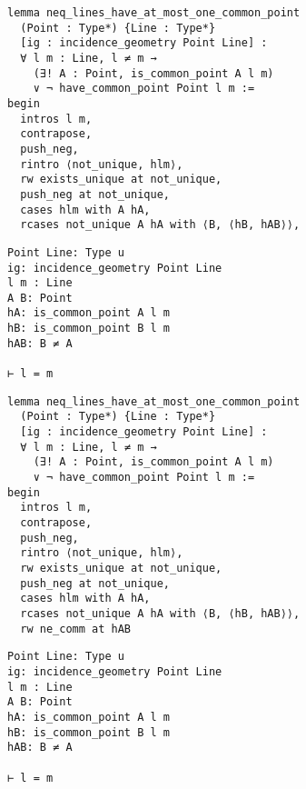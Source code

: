 \begin{frame}[fragile]
	\begin{multicols}{2}
		\begin{lstlisting}
lemma neq_lines_have_at_most_one_common_point 
  (Point : Type*) {Line : Type*} 
  [ig : incidence_geometry Point Line] :
  ∀ l m : Line, l ≠ m → 
    (∃! A : Point, is_common_point A l m) 
    ∨ ¬ have_common_point Point l m := 
begin
  intros l m,
  contrapose,
  push_neg,
  rintro ⟨not_unique, hlm⟩,
  rw exists_unique at not_unique,
  push_neg at not_unique,
  cases hlm with A hA,
  rcases not_unique A hA with ⟨B, ⟨hB, hAB⟩⟩,
\end{lstlisting}
		\columnbreak
		\begin{lstlisting}
Point Line: Type u
ig: incidence_geometry Point Line
l m : Line
A B: Point
hA: is_common_point A l m
hB: is_common_point B l m
hAB: B ≠ A

⊢ l = m
\end{lstlisting}
	\end{multicols}
\end{frame}










\begin{frame}[fragile]
	\begin{multicols}{2}
		\begin{lstlisting}
lemma neq_lines_have_at_most_one_common_point 
  (Point : Type*) {Line : Type*} 
  [ig : incidence_geometry Point Line] :
  ∀ l m : Line, l ≠ m → 
    (∃! A : Point, is_common_point A l m) 
    ∨ ¬ have_common_point Point l m := 
begin
  intros l m,
  contrapose,
  push_neg,
  rintro ⟨not_unique, hlm⟩,
  rw exists_unique at not_unique,
  push_neg at not_unique,
  cases hlm with A hA,
  rcases not_unique A hA with ⟨B, ⟨hB, hAB⟩⟩,
  rw ne_comm at hAB
\end{lstlisting}
		\columnbreak
		\begin{lstlisting}
Point Line: Type u
ig: incidence_geometry Point Line
l m : Line
A B: Point
hA: is_common_point A l m
hB: is_common_point B l m
hAB: B ≠ A

⊢ l = m
\end{lstlisting}
	\end{multicols}
\end{frame}










